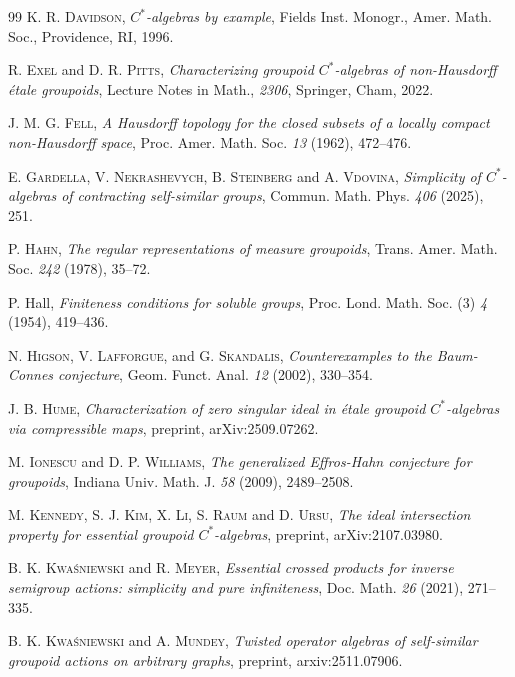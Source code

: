\documentclass[11pt, oneside, reqno]{amsart}
\theoremstyle{definition}
\theoremstyle{remark}
\numberwithin{equation}{section}
\begin{document}
\begin{thebibliography}{99}
 K. R. \textsc{Davidson}, \emph{$C^*$-algebras by example}, Fields Inst. Monogr.,  Amer. Math. Soc., Providence, RI, 1996.

 R. \textsc{Exel} and D. R. \textsc{Pitts}, \emph{Characterizing groupoid $C^*$-algebras of non-Hausdorff {\'e}tale groupoids}, Lecture Notes in Math., \emph{2306}, Springer, Cham, 2022. 

 J. M. G. \textsc{Fell}, \emph{A Hausdorff topology for the closed subsets of a locally compact non-Hausdorff space}, Proc. Amer. Math. Soc. \emph{13} (1962), 472--476.

 E. \textsc{Gardella}, V. \textsc{Nekrashevych}, B. \textsc{Steinberg} and A. \textsc{Vdovina}, \emph{Simplicity of $C^*$-algebras of contracting self-similar groups}, Commun. Math. Phys. \emph{406} (2025), 251.

 P. \textsc{Hahn}, \emph{The regular representations of measure groupoids}, Trans. Amer. Math. Soc. \emph{242} (1978), 35--72.

 P. Hall, \emph{Finiteness conditions for soluble groups}, Proc. Lond. Math. Soc. (3) \emph{4} (1954), 419--436.

 N. \textsc{Higson}, V. \textsc{Lafforgue}, and G. \textsc{Skandalis}, \emph{Counterexamples to the Baum-Connes conjecture},
Geom. Funct. Anal. \emph{12} (2002), 330--354.

 J. B. \textsc{Hume}, \emph{Characterization of zero singular ideal in {\'e}tale groupoid $C^*$-algebras via compressible maps}, preprint, arXiv:2509.07262.

 M. \textsc{Ionescu} and D. P. \textsc{Williams}, \emph{The generalized Effros-Hahn conjecture for groupoids}, Indiana Univ. Math. J. \emph{58} (2009), 2489--2508.

 M. \textsc{Kennedy}, S. J. \textsc{Kim}, X. \textsc{Li}, S. \textsc{Raum} and D. \textsc{Ursu}, \emph{The ideal intersection property for essential groupoid $C^*$-algebras}, preprint, arXiv:2107.03980.

 B. K. \textsc{Kwa{\'s}niewski} and R. \textsc{Meyer}, \emph{Essential crossed products for inverse semigroup actions: simplicity and pure infiniteness}, Doc. Math. \emph{26} (2021), 271--335.

 B. K. \textsc{Kwa{\'s}niewski} and A. \textsc{Mundey}, \emph{Twisted operator algebras of self-similar groupoid actions on arbitrary graphs}, preprint, arxiv:2511.07906.


\end{thebibliography}
\end{document}
